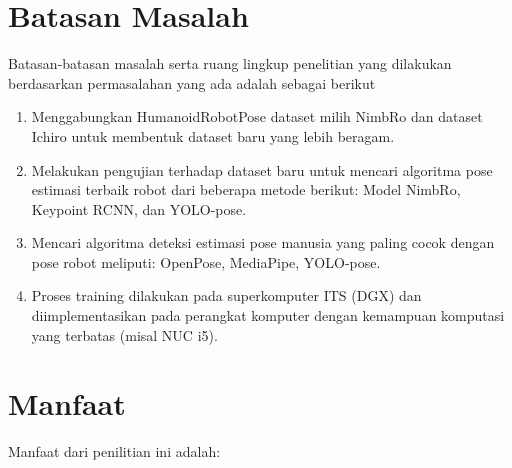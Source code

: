 \section{Batasan Masalah}
\label{sec:batasan-masalah}

Batasan-batasan masalah serta ruang lingkup penelitian yang dilakukan berdasarkan
permasalahan yang ada adalah sebagai berikut

\begin{enumerate}[nolistsep]

  \item Menggabungkan HumanoidRobotPose dataset milih NimbRo dan dataset Ichiro untuk membentuk dataset baru yang lebih beragam.
  \item Melakukan pengujian terhadap dataset baru untuk mencari algoritma pose estimasi terbaik robot dari beberapa metode berikut: Model NimbRo, Keypoint RCNN, dan YOLO-pose.
  \item Mencari algoritma deteksi estimasi pose manusia yang paling cocok dengan pose robot meliputi: OpenPose, MediaPipe, YOLO-pose.
  \item Proses training dilakukan pada superkomputer ITS (DGX) dan diimplementasikan pada perangkat komputer dengan kemampuan komputasi yang terbatas (misal NUC i5).   

\end{enumerate}

\section{Manfaat}
\label{sec:manfaat}

Manfaat dari penilitian ini adalah:

